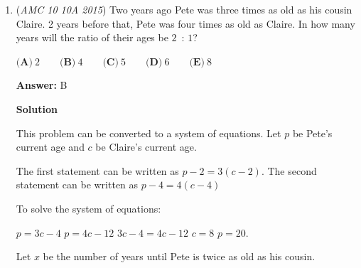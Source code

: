 \begin{enumerate}
 However, the number 0 must also be included, adding another multiple. So, the answer is $\boxed{\textbf{(B)}\ 21}$.

 



\textbf{Solution 2}

Using the formula for arithmetic sequence's nth term, we see that $a + (n-1)d \Longrightarrow13 + (n-1)3 =73, \Longrightarrow n = 21$$\boxed{\textbf{(B)}\ 21}$.

 



\textbf{Solution 3}

Minus each of the terms by $12$ to make the the sequence $1 , 4 , 7,..., 61$. $\frac{61-1}{3}=20, 20 + 1 = 21$
$\boxed{\textbf{(B)}\ 21}$.

 



\textbf{Solution 4}

Subtract each of the terms by $10$ to make the sequence $3 , 6 , 9,..., 60, 63$. Then divide the each term in the sequence by $3$ to get $1, 2, 3,..., 20, 21$. Now it is clear to see that there are $21$ terms in the sequence.$\boxed{\textbf{(B)}\ 21}$.

 


 


 


	\item (\textit{AMC 10 10A 2015}) Two years ago Pete was three times as old as his cousin Claire. 2 years before that, Pete was four times as old as Claire. In how many years will the ratio of their ages be $2$ : $1$?


 $\textbf{(A)}\ 2\qquad\textbf{(B)}\ 4\qquad\textbf{(C)}\ 5\qquad\textbf{(D)}\ 6\qquad\textbf{(E)}\ 8$

 \textbf{Answer: }B



\textbf{Solution}

This problem can be converted to a system of equations. Let $p$ be Pete's current age and $c$ be Claire's current age. 

 The first statement can be written as $p-2=3(c-2)$. The second statement can be written as $p-4=4(c-4)$

 To solve the system of equations:

 
$p=3c-4$
$p=4c-12$
$3c-4=4c-12$
$c=8$
$p=20.$

 Let $x$ be the number of years until Pete is twice as old as his cousin.


\end{enumerate}
